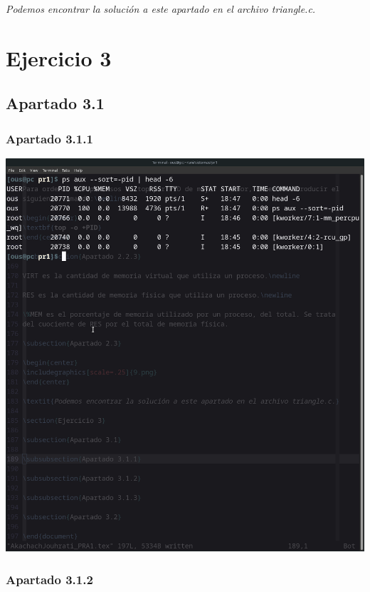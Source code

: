 \documentclass[spanish]{article}
\begin{document}
\textit{Podemos encontrar la solución a este apartado en el archivo triangle.c.}

\newpage

\section{Ejercicio 3}

\subsection{Apartado 3.1}

\subsubsection{Apartado 3.1.1}

\begin{center}
\includegraphics[scale=.25]{../img/10.png}
\end{center}

\newpage

\subsubsection{Apartado 3.1.2}
\end{document}
